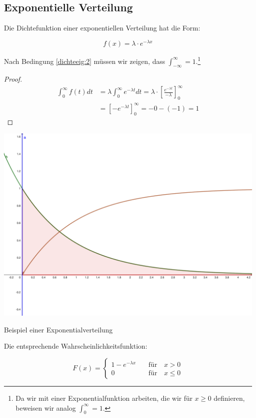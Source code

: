 \documentclass{tufte-handout}
\theoremstyle{own}
\begin{document}
\subsection{Exponentielle Verteilung}

Die Dichtefunktion einer exponentiellen Verteilung hat die Form:

\begin{equation}
	f(x) = \lambda \cdot e^{-\lambda x}
\end{equation}

Nach Bedingung \eqref{dichteeig:2} müssen wir zeigen, dass
$\int_{-\infty}^\infty = 1$.\footnote{Da wir mit einer Exponentialfunktion arbeiten, die wir für $x\geq0$ definieren, beweisen wir analog $\int_0^\infty = 1$.}

\begin{proof}
\begin{align*}
\int_0^\infty f(t) dt &= \lambda \int_0^\infty e^{-\lambda t} dt = \lambda \cdot [\frac{e^{-\lambda t}}{- \lambda}]_0^\infty \\
	&= [-e^{-\lambda t}]_0^\infty = -0 - (-1) = 1
\end{align*}
\end{proof}

\begin{marginfigure}
	\includegraphics{exponentialverteilung}
	\caption{Beispiel einer Exponentialverteilung}
\end{marginfigure}

Die entsprechende Wahrscheinlichkeitsfunktion:

\begin{equation}
F(x) = \begin{cases}
1 - e^{- \lambda x} \hspace{1em} & \text{für} \hspace{1em} x >0 \\
0 \hspace{1em} & \text{für} \hspace{1em} x \leq 0
\end{cases}
\end{equation}
\end{document}
